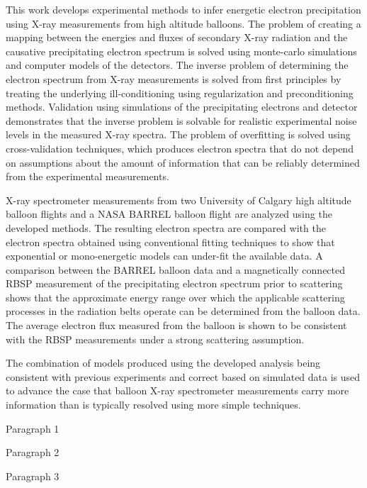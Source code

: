 \documentclass[12pt]{ucalgthes1}
\begin{document}
This work develops experimental methods to infer energetic electron precipitation using X-ray measurements from high altitude balloons. The problem of creating a mapping between the energies and fluxes of secondary X-ray radiation and the causative precipitating electron spectrum is solved using monte-carlo simulations and computer models of the detectors. The inverse problem of determining the electron spectrum from X-ray measurements is solved from first principles by treating the underlying ill-conditioning using regularization and preconditioning methods.  Validation using simulations of the precipitating electrons and detector demonstrates that the inverse problem is solvable for realistic experimental noise levels in the measured X-ray spectra. The problem of overfitting is solved using cross-validation techniques, which produces electron spectra that do not depend on assumptions about the amount of information that can be reliably determined from the experimental measurements.

X-ray spectrometer measurements from two University of Calgary high altitude balloon flights and a NASA BARREL balloon flight are analyzed using the developed methods. The resulting electron spectra are compared with the electron spectra obtained using conventional fitting techniques to show that exponential or mono-energetic models can under-fit the available data. A comparison between the BARREL balloon data and a magnetically connected RBSP measurement of the precipitating electron spectrum prior to scattering shows that the approximate energy range over which the applicable scattering processes in the radiation belts operate can be determined from the balloon data. The average electron flux measured from the balloon is shown to be consistent with the RBSP measurements under a strong scattering assumption. 

The combination of models produced using the developed analysis being consistent with previous experiments and correct based on simulated data is used to advance the case that balloon X-ray spectrometer measurements carry more information than is typically resolved using more simple techniques. 


\newpage
{}
{}
Paragraph 1

Paragraph 2

Paragraph 3

\begin{singlespace}
\newpage
{}
\tableofcontents
\pagestyle{plain}
\newpage
{}
\listoftables
\pagestyle{plain}
\newpage
{}
\listoffigures
\pagestyle{plain}
\clearpage
\clearpage          
\end{singlespace}
\newpage
{}
\end{document}
